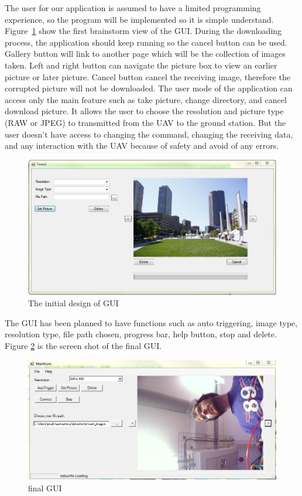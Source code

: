 The user for our application is assumed to have a limited programming experience, so the program will be implemented so it is simple understand. Figure~\ref{ini_GUI} show the first brainstorm view of the GUI. 
During the downloading process, the application should keep running so the cancel button can be used. 
Gallery button will link to another page which will be the collection of images taken. 
Left and right button can navigate the picture box to view an earlier picture or later picture. 
Cancel button cancel the receiving image, therefore the corrupted picture will not be downloaded. 
The user mode of the application can access only the main feature such as take picture, change directory, and cancel download picture.  
It allows the user to choose the resolution and picture type (RAW or JPEG) to transmitted from the UAV to the ground station. But the user doesn't have access to changing the command, changing the receiving data, and any interaction with the UAV because of safety and avoid of any errors. 
\begin{figure}[H]
\begin{center}
\includegraphics[width=1.0\textwidth]{figures/initialGUI.png} 
\end{center}
\caption{The initial design of GUI\label{ini_GUI}}
\end{figure}
The GUI has been planned to have functions such as auto triggering, image type, resolution type, file path chosen, progress bar, help button, stop and delete. Figure \ref{finalGUI} is the screen shot of the final GUI.

\begin{figure}[H]
\begin{center}
\includegraphics[width=1.0\textwidth]{figures/finalGUI.png} 
\end{center}
\caption{final GUI\label{finalGUI}}
\end{figure}

